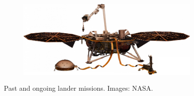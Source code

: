 \begin{figure}[h]
    \begin{subfigure}[t]{\subfigureWidth}
        \centering
		\includegraphics[height=\graphicsHeight]{sections/state-of-the-art/past-missions/images/lander-insight.png}
		\label{fig:sub:past-mission-lander-insight}
	\end{subfigure}
    \caption[Past and ongoing lander missions]
            {Past and ongoing lander missions. Images: NASA.}
	\label{fig:past-mission-landers}
\vspace{-2ex}
\end{figure}

